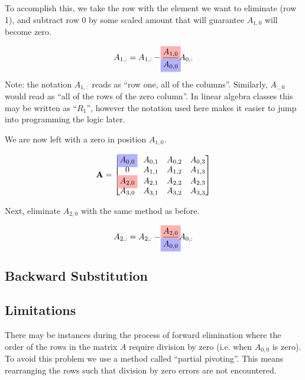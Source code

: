 \documentclass{../../KDHnotes}
\newcommand{\rhigh}[1]{%
  \ooalign{\hss\makebox[0pt]{\colorbox{red!30}{$#1$}}\hss\cr\phantom{$#1$}}%
}
\newcommand{\bhigh}[1]{%
  \ooalign{\hss\makebox[0pt]{\colorbox{blue!30}{$#1$}}\hss\cr\phantom{$#1$}}%
}
\begin{document}
To accomplish this, we take the row with the element we want to eliminate (row 1), and subtract row 0 by some scaled amount that will guarantee $A_{1,0}$ will become zero.

\begin{equation}
	A_{1,:} = A_{1, :} - \frac{
		\rhigh{A_{1,0}}
	} {
		\bhigh{A_{0,0}}
	}
	A_{0,:}
\end{equation}

Note: the notation $A_{1,:}$ reads as ``row one, all of the columns''. Similarly, $A_{:, 0}$ would read as ``all of the rows of the zero column''. In linear algebra classes this may be written as ``$R_1$'', however the notation used here makes it easier to jump into programming the logic later.


We are now left with a zero in position $A_{1,0}$.

\begin{equation}
	\vec{A} = 
	\begin{bmatrix}
		\bhigh{A_{0,0}} & A_{0,1} & A_{0,2} & A_{0,3}\\
		0 & A_{1,1} & A_{1,2} & A_{1,3}\\
		\rhigh{A_{2,0}} & A_{2,1} & A_{2,2} & A_{2,3}\\
		A_{3,0} & A_{3,1} & A_{3,2} & A_{3,3}\\
	\end{bmatrix}
\end{equation}


 Next, eliminate $A_{2,0}$ with the same method as before.

\begin{equation}
	A_{2,:} = A_{2, :} - \frac{
		\rhigh{A_{2,0}}
	} {
		\bhigh{A_{0,0}}
	}
	A_{0,:}
\end{equation}





\subsection{Backward Substitution}



\subsection{Limitations}
There may be instances during the process of forward elimination where the order of the rows in the matrix $A$ require division by zero (i.e. when $A_{0,0}$ is zero). To avoid this problem we use a method called ``partial pivoting''. This means rearranging the rows such that division by zero errors are not encountered.
\end{document}
